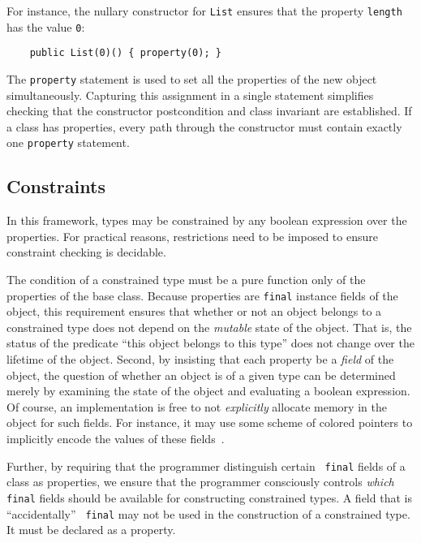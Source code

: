 For instance, the
nullary constructor for {\tt List} ensures that the property
{\tt length} has the value {\tt 0}:
{\footnotesize
\begin{verbatim}
    public List(0)() { property(0); }
\end{verbatim}}
The {\tt property} statement is used to set all the properties
of the new object simultaneously.  Capturing this assignment in
a single statement simplifies checking that the constructor
postcondition and class invariant are established.  If a class
has properties, every path through the constructor must contain
exactly one {\tt property} statement.



\subsection{Constraints}

In this framework, types may be constrained by any boolean
expression over the properties.  For practical reasons,
restrictions need to be imposed to ensure constraint checking is
decidable.

The condition of a constrained type must be a pure
function only of the properties of the base class.
Because properties are
{\tt final} instance fields of the object,
this requirement
ensures that whether or not an object belongs to a constrained type does
not depend on the {\em mutable} state of the object.
That is, the status of the
predicate ``this object belongs to this type'' does not
change over the lifetime of the object.  Second, by insisting that each
property be a {\em field} of the object, the question of
whether an object is of a given type can be
determined merely by examining the state of the object and evaluating
a boolean expression. Of course, an implementation is free to not {\em
explicitly} allocate memory in the object for such fields. For
instance, it may use some scheme of colored pointers to implicitly
encode the values of these fields~\cite{???}.

Further, by requiring that the programmer distinguish certain {\tt
final} fields of a class as properties, we ensure that the programmer
consciously controls {\em which} {\tt final} fields should be available for
constructing constrained types. A field that is ``accidentally'' {\tt
final} may not be used in the construction of a constrained type. It must be
declared as a property.

